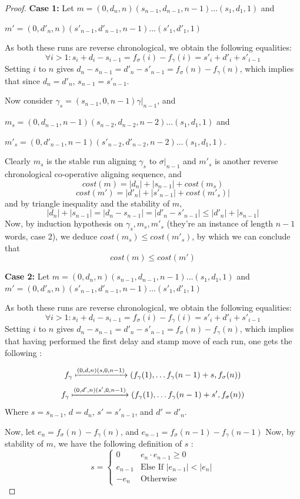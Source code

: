 \documentclass[runningheads]{llncs}
\newcounter{cases}
\begin{document}
\begin{proof}
\textbf{Case 1: } Let $m = (0, d_n, n)(s_{n-1}, d_{n-1}, n-1) \dots (s_1, d_1, 1)$ and 

$m' = (0, d'_n, n)(s'_{n-1}, d'_{n-1}, n-1) \dots (s'_1, d'_1, 1)$ 

As both these runs are reverse chronological, we obtain the following equalities: $$\forall i > 1 : s_i + d_i - s_{i-1} = f_\sigma(i) - f_\gamma(i) = s'_i + d'_i + s'_{i-1}$$ 
Setting $i$ to $n$ gives $d_n - s_{n-1} = d'_n - s'_{n-1} = f_\sigma(n) - f_\gamma(n)$, which implies that  since $d_n = d'_n$, $s_{n-1} = s'_{n-1}$. 

Now consider $\gamma_s = (s_{n-1}, 0, n-1)\gamma|_{n-1}$, and 

$m_s = (0, d_{n-1}, n-1)(s_{n-2}, d_{n-2}, n-2)\dots (s_1, d_1, 1)$ and 

$m'_s = (0, d'_{n-1}, n-1)(s'_{n-2}, d'_{n-2}, n-2)\dots (s_1, d_1, 1)$. 

Clearly $m_s$ is the stable run aligning $\gamma_s$ to $\sigma|_{n-1}$ and $m'_s$ is another reverse chronological co-operative aligning sequence, and $$cost(m) = |d_n| + |s_{n-1}| + cost(m_s)$$ $$cost(m') = |d'_n| + |s'_{n-1}| + cost(m'_s)|$$ and by triangle inequality and the stability of $m$, $$|d_n| + |s_{n-1}| = |d_n - s_{n-1}| = |d'_n - s'_{n-1}| \leq |d'_n| + |s_{n-1}|$$ 
Now, by induction hypothesis on $\gamma_s, m_s, m'_s$ (they're an instance of length $n-1$ words, case 2),  we deduce $cost(m_s) \leq cost(m'_s)$, by which we can conclude that $$cost(m) \leq cost(m')$$

\textbf{Case 2:} Let $m = {(0, d_n, n)(s_{n-1}, d_{n-1}, n-1) \dots (s_1, d_1, 1)}$ and 
$m' = (0, d'_n, n)(s'_{n-1}, d'_{n-1}, n-1) \dots (s'_1, d'_1, 1)$ 

As both these runs are reverse chronological, we obtain the following equalities: $$\forall i > 1 : s_i + d_i - s_{i-1} = f_\sigma(i) - f_\gamma(i) = s'_i + d'_i + s'_{i-1}$$ 
Setting $i$ to $n$ gives $d_n - s_{n-1} = d'_n - s'_{n-1} = f_\sigma(n) - f_\gamma(n)$, which implies that having performed the first delay and stamp move of each run, one gets the following :  

$$f_\gamma \xmapsto{(0, d, n)(s, 0, n-1)} (f_\gamma(1), \dots f_\gamma(n-1) + s, f_\sigma(n))$$
$$f_\gamma \xmapsto{(0, d', n)(s', 0, n-1)} (f_\gamma(1), \dots f_\gamma(n-1) + s', f_\sigma(n))$$
Where $s = s_{n-1}$, $d = d_n$, $s' = s'_{n-1}$, and $d' = d'_n$. 

Now, let $e_n = f_\sigma(n) - f_\gamma(n)$, and $e_{n-1} = f_\sigma(n-1) - f_\gamma(n-1)$
Now, by stability of $m$, we have the following definition of $s$ : 
$$s = \begin{cases}
	0 & e_n\cdot e_{n-1} \geq 0 \\
	e_{n-1} & \textrm{Else If }|e_{n-1}| < |e_n| \\
	-e_n & \textrm{Otherwise}
\end{cases}$$


\end{proof}
\end{document}
